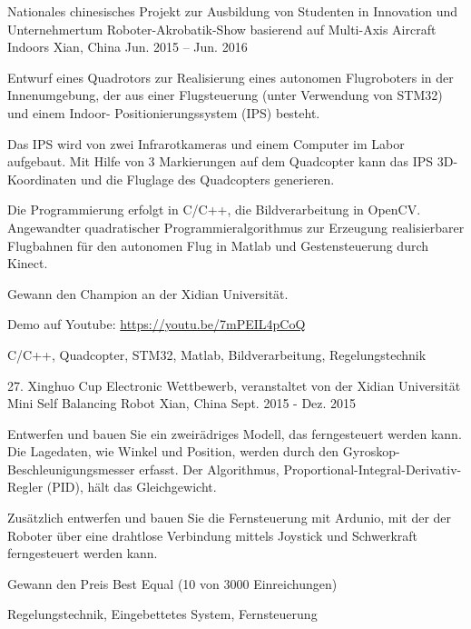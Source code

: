 \begin{cventries}
  \cventry
    {Nationales chinesisches Projekt zur Ausbildung von Studenten in Innovation und Unternehmertum} 
    {Roboter-Akrobatik-Show basierend auf Multi-Axis Aircraft Indoors}
    {Xian, China} %
    {Jun. 2015 – Jun. 2016} %
    {
      \begin{cvitems} %
        \item {Entwurf eines Quadrotors zur Realisierung eines autonomen Flugroboters in der Innenumgebung, der aus einer Flugsteuerung (unter Verwendung von STM32) und einem Indoor- Positionierungssystem (IPS) besteht.}
        \item {Das IPS wird von zwei Infrarotkameras und einem Computer im Labor aufgebaut. Mit Hilfe von 3 Markierungen auf dem Quadcopter kann das IPS 3D-Koordinaten und die Fluglage des Quadcopters generieren.}
        \item {Die Programmierung erfolgt in C/C++, die Bildverarbeitung in OpenCV. Angewandter quadratischer Programmieralgorithmus zur Erzeugung realisierbarer Flugbahnen für den autonomen Flug in Matlab und Gestensteuerung durch Kinect.}
        \item {Gewann den Champion an der Xidian Universität.}
        \item {Demo auf Youtube:  \url{https://youtu.be/7mPEIL4pCoQ}}
      \end{cvitems}
    }
	{C/C++,  Quadcopter, STM32, Matlab, Bildverarbeitung, Regelungstechnik }	

  \cventry
    {27. Xinghuo Cup Electronic Wettbewerb, veranstaltet von der Xidian Universität} %
    {Mini Self Balancing Robot} %
    {Xian, China} %
    {Sept. 2015 - Dez. 2015} %
    {
      \begin{cvitems} %
        \item {Entwerfen und bauen Sie ein zweirädriges Modell, das ferngesteuert werden kann. Die Lagedaten, wie Winkel und Position, werden durch den Gyroskop-Beschleunigungsmesser erfasst. Der Algorithmus, Proportional-Integral-Derivativ-Regler (PID), hält das Gleichgewicht. }
       \item {Zusätzlich entwerfen und bauen Sie die Fernsteuerung mit Ardunio, mit der der Roboter über eine drahtlose Verbindung mittels Joystick und Schwerkraft ferngesteuert werden kann.}
       \item {Gewann den Preis Best Equal (10 von 3000 Einreichungen)}
      \end{cvitems}
    }{Regelungstechnik, Eingebettetes System, Fernsteuerung}

\end{cventries}
